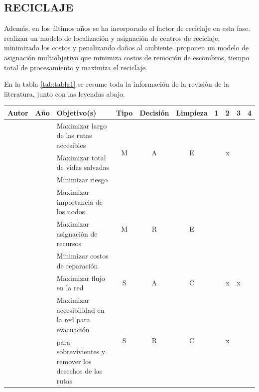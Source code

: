 \documentclass[12pt,a4paper]{article}
\begin{document}
\subsection{RECICLAJE}

Además, en los últimos años se ha incorporado el factor de reciclaje en esta fase. \citet{Boonmee2018} realizan un modelo de localización y asignación de centros de reciclaje, minimizado los costos y penalizando daños al ambiente. \citet{Wang2019} proponen un modelo de asignación multiobjetivo que minimiza costos de remoción de escombros, tiempo total de procesamiento y maximiza el reciclaje.

En la tabla \ref{tab:tabla1} se resume toda la información de la revisión de la literatura, junto con las leyendas abajo.

\begin{table}[h!]
\resizebox{16cm}{!} {
\begin{tabular}{l|c|l|c|c|c|c|c|c|c}
\hline
Autor & Año & Objetivo(s) & Tipo & Decisión & Limpieza & 1 & 2 & 3 & 4 \\ \hline

\multirow{3}{*}{\citeauthor{Feng2003}} & \multirow{3}{*}{\citeyear{Feng2003}} & Maximizar largo de las rutas accesibles & \multirow{3}{*}{M} & \multirow{3}{*}{A} & \multirow{3}{*}{E} & \multirow{3}{*}{}  & \multirow{3}{*}{x}  & \multirow{3}{*}{ } & \multirow{3}{*}{ } \\ \cline{3-3}
& & Maximizar total de vidas salvadas &  &  &  & & & & \\ \cline{3-3}
& & Minimizar riesgo &  &  &  & & & & \\ \hline

 
\multirow{3}{*}{\citeauthor{Karlaftis2007}} & \multirow{3}{*}{\citeyear{Karlaftis2007}}                      & Maximizar importancia de los nodos & \multirow{3}{*}{M} & \multirow{3}{*}{R} & \multirow{3}{*}{E}  & \multirow{3}{*}{}  & \multirow{3}{*}{ } & \multirow{3}{*}{}  & \multirow{3}{*}{} \\ \cline{3-3}
& & Maximizar  asignación de recursos &  &  &  & & & & \\ \cline{3-3}
& & Minimizar costos de reparación &  &  &  & & & & \\ \hline
 

\citeauthor{Brooks2013} & \citeyear{Brooks2013} & Maximizar flujo en la red                           & S & A & C & & x & x & \\ \hline

\multirow{2}{*}{\citeauthor{Aksu2014}} & \multirow{2}{*}{\citeyear{Aksu2014}} & Maximizar accesibilidad en la red para evacuación & \multirow{2}{*}{S} & \multirow{2}{*}{R} & \multirow{2}{*}{C}  & \multirow{2}{*}{}  & \multirow{2}{*}{x}  & \multirow{2}{*}{} & \multirow{2}{*}{} \\
 & & para sobrevivientes y remover los desechos de las rutas &  &  &  & & & & \\ \hline


\end{tabular}}
\end{table}
\end{document}
